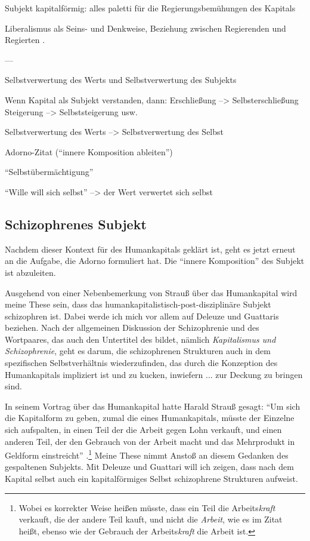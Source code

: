 \documentclass[12pt,
               DIV13,
               paper=a4,
               twoside=false,
               onehalfspacing,
               bibliography=totoc,
               toc=graduated,
               draft,
               ]{scrartcl}
\newcommand{\pc}[2]{\parencite[#1]{#2}}
\newcommand{\vgl}[2]{\parencite[vgl.][#1]{#2}}
\begin{document}
Subjekt kapitalförmig: alles paletti für die Regierungsbemühungen des
Kapitals

Liberalismus als Seins- und Denkweise, Beziehung zwischen Regierenden
und Regierten \vgl{305}{gbp}.

---

Selbstverwertung des Werts und Selbstverwertung des Subjekts

Wenn Kapital als Subjekt verstanden, dann:
Erschließung --> Selbsterschließung
Steigerung --> Selbststeigerung usw.

Selbstverwertung des Werts --> Selbstverwertung des Selbst

Adorno-Zitat ("`innere Komposition ableiten"')

"`Selbstübermächtigung"'

"`Wille will sich selbst"' --> der Wert verwertet sich selbst


\subsection{Schizophrenes Subjekt}

Nachdem dieser Kontext für des Humankapitals geklärt ist, geht es
jetzt erneut an die Aufgabe, die Adorno formuliert hat. Die "`innere
Komposition"' \pc{261}{min} des Subjekt ist abzuleiten.

Ausgehend von einer Nebenbemerkung von Strauß über das Humankapital
wird meine These sein, dass das humankapitalistisch-post-disziplinäre
Subjekt schizophren ist. Dabei werde ich mich vor allem auf Deleuze
und Guattaris  beziehen. Nach der allgemeinen Diskussion
der Schizophrenie und des Wortpaares, das auch den Untertitel des
 bildet, nämlich \emph{Kapitalismus und Schizophrenie},
geht es darum, die schizophrenen Strukturen auch in dem spezifischen
Selbstverhältnis wiederzufinden, das durch die Konzeption des
Humankapitals impliziert ist und zu kucken, inwiefern ... zur Deckung
zu bringen sind.

In seinem Vortrag über das Humankapital hatte Harald Strauß gesagt:
"`Um sich die Kapitalform zu geben, zumal die eines Humankapitals,
müsste der Einzelne sich aufspalten, in einen Teil der die Arbeit
gegen Lohn verkauft, und einen anderen Teil, der den Gebrauch von der
Arbeit macht und das Mehrprodukt in Geldform einstreicht"' \pc{S.
126}{strauss}.\footnote{Wobei es korrekter Weise heißen müsste, dass
ein Teil die Arbeits\emph{kraft} verkauft, die der andere Teil kauft,
und nicht die \emph{Arbeit}, wie es im Zitat heißt, ebenso wie der
Gebrauch der Arbeits\emph{kraft} die Arbeit ist.} Meine These nimmt
Anstoß an diesem Gedanken des gespaltenen Subjekts. Mit Deleuze und
Guattari will ich zeigen, dass nach dem Kapital selbst auch ein
kapitalförmiges Selbst schizophrene Strukturen aufweist.
\end{document}
